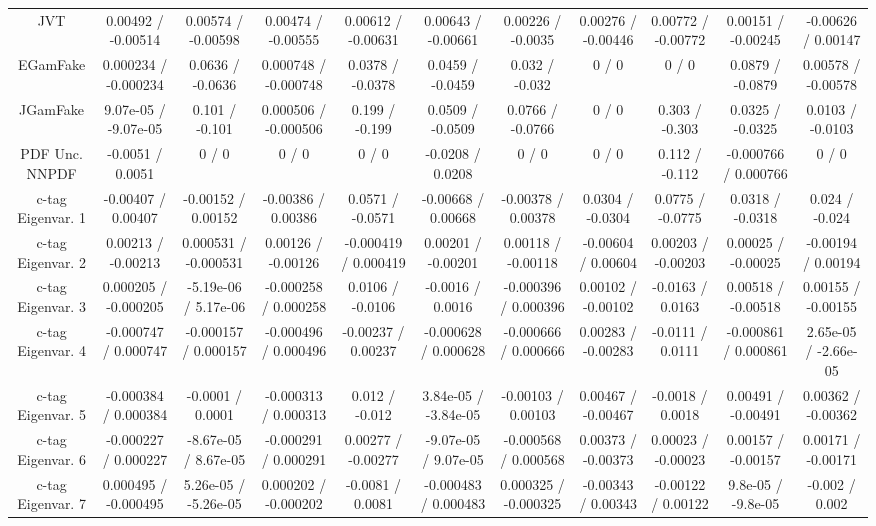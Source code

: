 \begin{table}[htbp]
\begin{center}
\begin{tabular}{|c|c|c|c|c|c|c|c|c|c|c|}
  JVT & 0.00492 / -0.00514 & 0.00574 / -0.00598 & 0.00474 / -0.00555 & 0.00612 / -0.00631 & 0.00643 / -0.00661 & 0.00226 / -0.0035 & 0.00276 / -0.00446 & 0.00772 / -0.00772 & 0.00151 / -0.00245 & -0.00626 / 0.00147 \\ 
  EGamFake & 0.000234 / -0.000234 & 0.0636 / -0.0636 & 0.000748 / -0.000748 & 0.0378 / -0.0378 & 0.0459 / -0.0459 & 0.032 / -0.032 & 0 / 0 & 0 / 0 & 0.0879 / -0.0879 & 0.00578 / -0.00578 \\ 
  JGamFake & 9.07e-05 / -9.07e-05 & 0.101 / -0.101 & 0.000506 / -0.000506 & 0.199 / -0.199 & 0.0509 / -0.0509 & 0.0766 / -0.0766 & 0 / 0 & 0.303 / -0.303 & 0.0325 / -0.0325 & 0.0103 / -0.0103 \\ 
  PDF Unc. NNPDF & -0.0051 / 0.0051 & 0 / 0 & 0 / 0 & 0 / 0 & -0.0208 / 0.0208 & 0 / 0 & 0 / 0 & 0.112 / -0.112 & -0.000766 / 0.000766 & 0 / 0 \\ 
  c-tag Eigenvar. 1 & -0.00407 / 0.00407 & -0.00152 / 0.00152 & -0.00386 / 0.00386 & 0.0571 / -0.0571 & -0.00668 / 0.00668 & -0.00378 / 0.00378 & 0.0304 / -0.0304 & 0.0775 / -0.0775 & 0.0318 / -0.0318 & 0.024 / -0.024 \\ 
  c-tag Eigenvar. 2 & 0.00213 / -0.00213 & 0.000531 / -0.000531 & 0.00126 / -0.00126 & -0.000419 / 0.000419 & 0.00201 / -0.00201 & 0.00118 / -0.00118 & -0.00604 / 0.00604 & 0.00203 / -0.00203 & 0.00025 / -0.00025 & -0.00194 / 0.00194 \\ 
  c-tag Eigenvar. 3 & 0.000205 / -0.000205 & -5.19e-06 / 5.17e-06 & -0.000258 / 0.000258 & 0.0106 / -0.0106 & -0.0016 / 0.0016 & -0.000396 / 0.000396 & 0.00102 / -0.00102 & -0.0163 / 0.0163 & 0.00518 / -0.00518 & 0.00155 / -0.00155 \\ 
  c-tag Eigenvar. 4 & -0.000747 / 0.000747 & -0.000157 / 0.000157 & -0.000496 / 0.000496 & -0.00237 / 0.00237 & -0.000628 / 0.000628 & -0.000666 / 0.000666 & 0.00283 / -0.00283 & -0.0111 / 0.0111 & -0.000861 / 0.000861 & 2.65e-05 / -2.66e-05 \\ 
  c-tag Eigenvar. 5 & -0.000384 / 0.000384 & -0.0001 / 0.0001 & -0.000313 / 0.000313 & 0.012 / -0.012 & 3.84e-05 / -3.84e-05 & -0.00103 / 0.00103 & 0.00467 / -0.00467 & -0.0018 / 0.0018 & 0.00491 / -0.00491 & 0.00362 / -0.00362 \\ 
  c-tag Eigenvar. 6 & -0.000227 / 0.000227 & -8.67e-05 / 8.67e-05 & -0.000291 / 0.000291 & 0.00277 / -0.00277 & -9.07e-05 / 9.07e-05 & -0.000568 / 0.000568 & 0.00373 / -0.00373 & 0.00023 / -0.00023 & 0.00157 / -0.00157 & 0.00171 / -0.00171 \\ 
  c-tag Eigenvar. 7 & 0.000495 / -0.000495 & 5.26e-05 / -5.26e-05 & 0.000202 / -0.000202 & -0.0081 / 0.0081 & -0.000483 / 0.000483 & 0.000325 / -0.000325 & -0.00343 / 0.00343 & -0.00122 / 0.00122 & 9.8e-05 / -9.8e-05 & -0.002 / 0.002 \\ 

\end{tabular}
\end{center}
\end{table}
